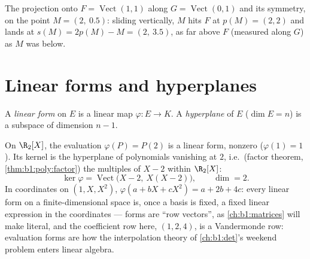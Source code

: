 \begin{omfigure}

{\small The projection onto $F = \operatorname{Vect}(1,1)$ along
$G = \operatorname{Vect}(0,1)$ and its symmetry, on the point $M
= (2,\ 0.5)$: sliding vertically, $M$ hits $F$ at $p(M) = (2,2)$
and lands at $s(M) = 2p(M) - M = (2,\ 3.5)$, as far above $F$
(measured along $G$) as $M$ was below.}
\end{omfigure}

\section{Linear forms and hyperplanes}

\begin{definition}\label{def:b1:linmaps:forms}
A \emph{linear form} on $E$ is a linear map
$\varphi \colon E \to K$. A \emph{hyperplane} of
$E$ ($\dim E = n$) is a subspace of dimension $n - 1$.
\end{definition}

\begin{example}
\label{ex:b1:linmaps:evaluationform}
On $\R_2[X]$, the evaluation $\varphi(P) = P(2)$ is a linear
form, nonzero ($\varphi(1) = 1$). Its kernel is the hyperplane
of polynomials vanishing at $2$, i.e.\ (factor theorem,
\cref{thm:b1:poly:factor}) the multiples of $X - 2$ within
$\R_2[X]$:
\[
\ker\varphi = \operatorname{Vect}\bigl(X - 2,\ X(X - 2)\bigr),
\qquad \dim = 2 .
\]
In coordinates on $(1, X, X^2)$, $\varphi(a + bX + cX^2) = a +
2b + 4c$: every linear form on a finite-dimensional space is,
once a basis is fixed, a fixed linear expression in the
coordinates --- forms are ``row vectors'', as
\cref{ch:b1:matrices} will make literal, and the coefficient
row here, $(1, 2, 4)$, is a Vandermonde row: evaluation forms
are how the interpolation theory of \cref{ch:b1:det}'s weekend
problem enters linear algebra.
\end{example}

